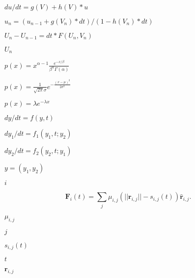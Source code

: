 \documentclass{article}
\begin{document}
$du/dt = g(V) + h(V)*u$
\pagebreak

$u_n = ( u_{n-1} + g(V_n)*dt ) / ( 1 - h(V_n)*dt )$
\pagebreak

$U_n - U_{n-1} = dt*F(U_n, V_n)$
\pagebreak

$U_n$
\pagebreak

$\displaystyle p(x) = x^{\alpha-1}\frac{e^{-x/\beta}}{\beta^\alpha\Gamma(\alpha)}$
\pagebreak

$\displaystyle p(x) =
  \frac{1}{\sqrt{2\pi}\sigma} e^{-\frac{(x-\mu)^2}{2\sigma^2}}
$
\pagebreak

$\displaystyle p(x) = \lambda e^{-\lambda x}$
\pagebreak

$dy/dt = f(y, t)$
\pagebreak

$dy_1/dt = f_1(y_1, t; y_2)$
\pagebreak

$dy_2/dt = f_2(y_2, t; y_1)$
\pagebreak

$y = (y_1, y_2)$
\pagebreak

$i$
\pagebreak

\[
\mathbf{F}_{i}(t) = \sum_{j} \mu_{i,j} ( || \mathbf{r}_{i,j} || - s_{i,j}(t) ) \hat{\mathbf{r}}_{i,j}.
\]
\pagebreak

$\mu_{i,j}$
\pagebreak

$j$
\pagebreak

$s_{i,j}(t)$
\pagebreak

$t$
\pagebreak

$\mathbf{r}_{i,j}$
\pagebreak

$\hat{}$
\pagebreak
\end{document}
